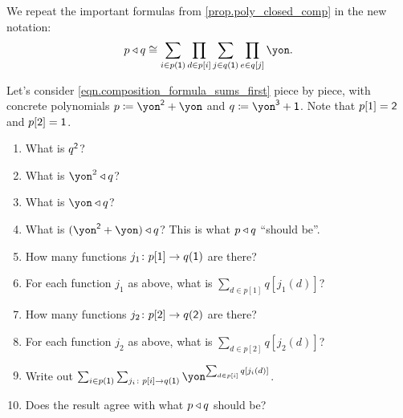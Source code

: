 \documentclass[DynamicalBook]{subfiles}
\begin{document}
We repeat the important formulas from \cref{prop.poly_closed_comp} in the new notation:
\begin{equation}\label{eqn.composite_formula}
p\tri q\cong\sum_{i\in p(\1)}\prod_{d\in p[i]}\sum_{j\in q(\1)}\prod_{e\in q[j]}\yon.
\end{equation}


\begin{exercise}
Let's consider \eqref{eqn.composition_formula_sums_first} piece by piece, with concrete polynomials $p\coloneqq\yon^\2+\yon$ and $q\coloneqq \yon^\3+\1$. Note that $p[1]=\textsf{2}$ and $p[2]=\textsf{1}$.
\begin{enumerate}
	\item What is $q^{\textsf{2}}$?
	\item What is $\yon^2\tri q$? 
	\item What is $\yon\tri q$?
	\item What is $(\yon^\2+\yon)\tri q$? This is what $p\mathbin{\triangleleft} q$ ``should be''.
	\item How many functions $j_1\colon p[1]\to q(\textsf{1})$ are there?
	\item For each function $j_1$ as above, what is $\sum_{d\in p[1]} q[j_1(d)]$?
	\item How many functions $j_2\colon p[2]\to q(\textsf{2})$ are there?
	\item For each function $j_2$ as above, what is $\sum_{d\in p[2]} q[j_2(d)]$?
	\item Write out $\sum_{i\in p(\1)}\sum_{j_i\colon p[i]\to q(\1)}\yon^{\sum_{d\in p[i]}q[j_i(d)]}$.
	\item Does the result agree with what $p\mathbin{\triangleleft} q$ should be?
\qedhere
\end{enumerate}
\end{exercise}
\end{document}
